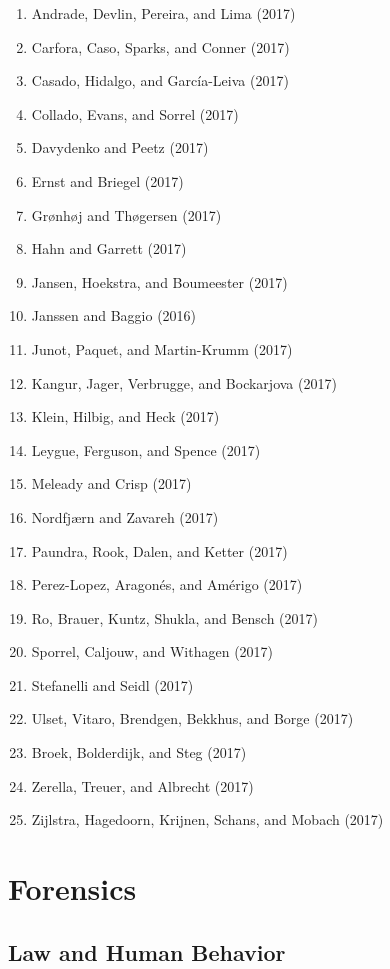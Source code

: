 \documentclass[english,man]{apa6}
\providecommand{\tightlist}{%
  \setlength{\itemsep}{0pt}\setlength{\parskip}{0pt}}
\begin{document}
\begin{enumerate}
\def\labelenumi{\arabic{enumi})}
\tightlist
\item
  Andrade, Devlin, Pereira, and Lima (2017)
\item
  Carfora, Caso, Sparks, and Conner (2017)
\item
  Casado, Hidalgo, and García-Leiva (2017)
\item
  Collado, Evans, and Sorrel (2017)
\item
  Davydenko and Peetz (2017)
\item
  Ernst and Briegel (2017)
\item
  Grønhøj and Thøgersen (2017)
\item
  Hahn and Garrett (2017)
\item
  Jansen, Hoekstra, and Boumeester (2017)
\item
  Janssen and Baggio (2016)
\item
  Junot, Paquet, and Martin-Krumm (2017)
\item
  Kangur, Jager, Verbrugge, and Bockarjova (2017)
\item
  Klein, Hilbig, and Heck (2017)
\item
  Leygue, Ferguson, and Spence (2017)
\item
  Meleady and Crisp (2017)
\item
  Nordfjærn and Zavareh (2017)
\item
  Paundra, Rook, Dalen, and Ketter (2017)
\item
  Perez-Lopez, Aragonés, and Amérigo (2017)
\item
  Ro, Brauer, Kuntz, Shukla, and Bensch (2017)
\item
  Sporrel, Caljouw, and Withagen (2017)
\item
  Stefanelli and Seidl (2017)
\item
  Ulset, Vitaro, Brendgen, Bekkhus, and Borge (2017)
\item
  Broek, Bolderdijk, and Steg (2017)
\item
  Zerella, Treuer, and Albrecht (2017)
\item
  Zijlstra, Hagedoorn, Krijnen, Schans, and Mobach (2017)
\end{enumerate}

\section{Forensics}\label{forensics}

\subsection{Law and Human Behavior}\label{law-and-human-behavior}
\end{document}
